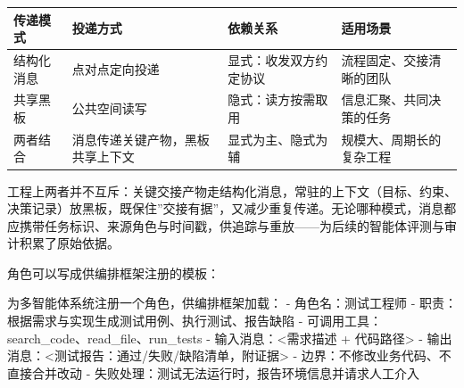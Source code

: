 \documentclass[
]{ctexbook}
\newenvironment{Shaded}{
  \ttfamily\small
}{}
\newcommand{\NormalTok}[1]{#1}
\newcounter{none}
\begin{document}
{\def\LTcaptype{none} %
\begin{longtable}[]{@{}
  >{\raggedright\arraybackslash}p{}
  >{\raggedright\arraybackslash}p{}
  >{\raggedright\arraybackslash}p{}
  >{\raggedright\arraybackslash}p{}@{}}
\toprule\noalign{}
\begin{minipage}[b]{\linewidth}\raggedright
传递模式
\end{minipage} & \begin{minipage}[b]{\linewidth}\raggedright
投递方式
\end{minipage} & \begin{minipage}[b]{\linewidth}\raggedright
依赖关系
\end{minipage} & \begin{minipage}[b]{\linewidth}\raggedright
适用场景
\end{minipage} \\
\midrule\noalign{}
\endhead
\bottomrule\noalign{}
\endlastfoot
结构化消息 & 点对点定向投递 & 显式：收发双方约定协议 &
流程固定、交接清晰的团队 \\
共享黑板 & 公共空间读写 & 隐式：读方按需取用 &
信息汇聚、共同决策的任务 \\
两者结合 & 消息传递关键产物，黑板共享上下文 & 显式为主、隐式为辅 &
规模大、周期长的复杂工程 \\
\end{longtable}
}

工程上两者并不互斥：关键交接产物走结构化消息，常驻的上下文（目标、约束、决策记录）放黑板，既保住''交接有据''，又减少重复传递。无论哪种模式，消息都应携带任务标识、来源角色与时间戳，供追踪与重放------为后续的智能体评测与审计积累了原始依据。

角色可以写成供编排框架注册的模板：

\begin{Shaded}
\begin{Highlighting}[]
\NormalTok{为多智能体系统注册一个角色，供编排框架加载：}
\NormalTok{{-} 角色名：测试工程师}
\NormalTok{{-} 职责：根据需求与实现生成测试用例、执行测试、报告缺陷}
\NormalTok{{-} 可调用工具：search\_code、read\_file、run\_tests}
\NormalTok{{-} 输入消息：\textless{}需求描述 + 代码路径\textgreater{}}
\NormalTok{{-} 输出消息：\textless{}测试报告：通过/失败/缺陷清单，附证据\textgreater{}}
\NormalTok{{-} 边界：不修改业务代码、不直接合并改动}
\NormalTok{{-} 失败处理：测试无法运行时，报告环境信息并请求人工介入}
\end{Highlighting}
\end{Shaded}
\end{document}
